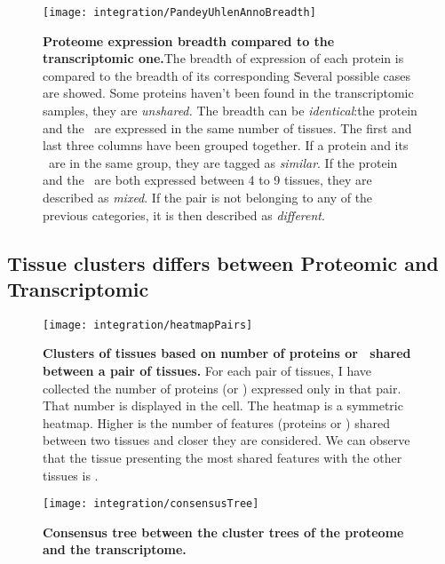 \begin{figure}[!htbp]
\texttt{[image: integration/PandeyUhlenAnnoBreadth]}\centering
    \caption[Proteome expression breadth compared to the transcriptomic one]{\label{fig:breadthColPandeyUhlen}\textbf{Proteome expression breadth
    compared to the transcriptomic one.}The breadth of expression of each protein
    is compared to the breadth of its corresponding \mRNA\. Several possible cases
    are showed. Some proteins haven't been found in the transcriptomic samples,
    they are \emph{unshared.}
    The breadth can be \emph{identical}:the protein and the \mRNA\ are
    expressed in the same number of tissues. The first and last three columns
    have been grouped together. If a protein and its \mRNA\ are in the same group,
    they are tagged as \emph{similar}. If the protein and the \mRNA\ are both
    expressed between 4 to 9 tissues, they are described as \emph{mixed}. If the
    pair is not belonging to any of the previous categories, it is then described
    as \emph{different}.}
\end{figure}


\subsection{Tissue clusters differs between Proteomic and Transcriptomic}
\begin{figure}[!htbp]
\texttt{[image: integration/heatmapPairs]}\centering
    \caption[Clusters of tissues based on number of proteins or \mRNAs\ shared
    between a pair of tissues]{\label{fig:heatmapPairs}\textbf{Clusters of
    tissues based on number of proteins or \mRNAs\ shared between a pair of
    tissues.} For each pair of tissues, I have collected the number of proteins
    (or \mRNAs) expressed only in that pair. That number is displayed in the
    cell. The heatmap is a symmetric heatmap. Higher is the number of features
    (proteins or \mRNAs) shared between two tissues and closer they are
    considered. We can observe that the tissue presenting the most shared features
    with the other tissues is .}
\end{figure}


\begin{figure}[!htbp]
\texttt{[image: integration/consensusTree]}\centering
    \caption[Consensus tree between the cluster trees of the proteome and the
    transcriptome]{\label{fig:consensusTree}\textbf{Consensus tree between the
    cluster trees of the proteome and the transcriptome.}}
\end{figure}

